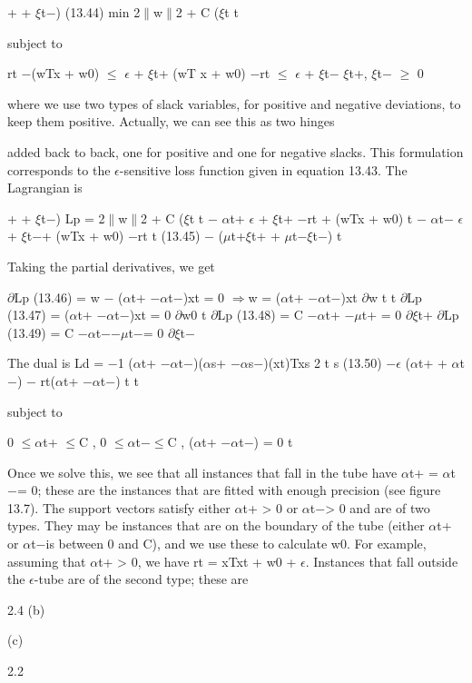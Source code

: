 + + $\xi$t$-$) (13.44) min 2$\parallel$w$\parallel$2 + C ($\xi$t t

subject to

rt $-$(wTx + w0) $\leq$ $\epsilon$ + $\xi$t+ (wT x + w0) $-$rt $\leq$ $\epsilon$ + $\xi$t$-$ $\xi$t+, $\xi$t$-$ $\geq$ 0

where we use two types of slack variables, for positive and negative deviations, to keep them positive. Actually, we can see this as two hinges

added back to back, one for positive and one for negative slacks. This formulation corresponds to the $\epsilon$-sensitive loss function given in equation 13.43. The Lagrangian is

+ + $\xi$t$-$) Lp = 2$\parallel$w$\parallel$2 + C ($\xi$t t $-$ $\alpha$t+ $\epsilon$ + $\xi$t+ $-$rt + (wTx + w0) t $-$ $\alpha$t$-$ $\epsilon$ + $\xi$t$-$+ (wTx + w0) $-$rt t (13.45) $-$ ($\mu$t+$\xi$t+ + $\mu$t$-$$\xi$t$-$) t

Taking the partial derivatives, we get

$\partial$Lp (13.46) = w $-$ ($\alpha$t+ $-$$\alpha$t$-$)xt = 0 $\Rightarrow$w = ($\alpha$t+ $-$$\alpha$t$-$)xt $\partial$w t t $\partial$Lp (13.47) = ($\alpha$t+ $-$$\alpha$t$-$)xt = 0 $\partial$w0 t $\partial$Lp (13.48) = C $-$$\alpha$t+ $-$$\mu$t+ = 0 $\partial$$\xi$t+ $\partial$Lp (13.49) = C $-$$\alpha$t$-$$-$$\mu$t$-$= 0 $\partial$$\xi$t$-$

The dual is Ld = $-$1 ($\alpha$t+ $-$$\alpha$t$-$)($\alpha$s+ $-$$\alpha$s$-$)(xt)Txs 2 t s (13.50) $-$$\epsilon$ ($\alpha$t+ + $\alpha$t$-$) $-$ rt($\alpha$t+ $-$$\alpha$t$-$) t t

subject to

0 $\leq$$\alpha$t+ $\leq$C , 0 $\leq$$\alpha$t$-$$\leq$C , ($\alpha$t+ $-$$\alpha$t$-$) = 0 t

Once we solve this, we see that all instances that fall in the tube have $\alpha$t+ = $\alpha$t$-$= 0; these are the instances that are fitted with enough precision (see figure 13.7). The support vectors satisfy either $\alpha$t+ > 0 or $\alpha$t$-$> 0 and are of two types. They may be instances that are on the boundary of the tube (either $\alpha$t+ or $\alpha$t$-$is between 0 and C), and we use these to calculate w0. For example, assuming that $\alpha$t+ > 0, we have rt = xTxt + w0 + $\epsilon$. Instances that fall outside the $\epsilon$-tube are of the second type; these are

2.4 (b)

(c)

2.2

